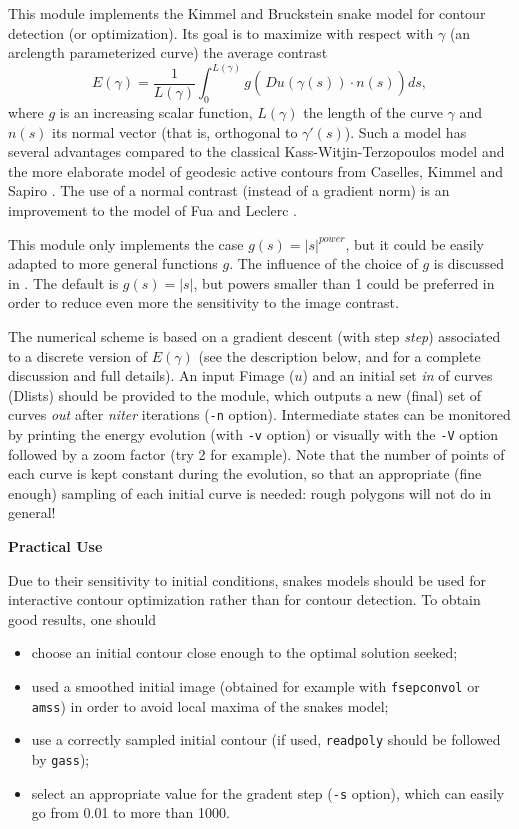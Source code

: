 This module implements the Kimmel and Bruckstein snake model
\cite{KB2} for contour detection 
(or optimization). Its goal is to maximize with respect with 
$\gamma$ (an arclength parameterized curve) the average contrast
$$E(\gamma) =\frac 1 {L(\gamma)}\int_{0}^{L(\gamma)} g\left(\frac{}{}\!\!
Du(\gamma(s))\cdot n(s)\right)ds,$$
where $g$ is an increasing scalar function, $L(\gamma)$ the length of
the curve $\gamma$ and $n(s)$ its normal vector (that is, orthogonal
to $\gamma'(s)$). Such a model has several advantages compared to
the classical Kass-Witjin-Terzopoulos model \cite{KWT} and
the more elaborate model of geodesic active contours from 
Caselles, Kimmel and Sapiro \cite{CKS}. 
The use of a normal contrast (instead
of a gradient norm) is an improvement to the model of Fua
and Leclerc \cite{FL}.

This module only implements the case
$g(s)=|s|^{power}$, but it could be easily adapted to more general 
functions $g$. The influence of the
choice of $g$ is discussed in \cite{DMM}.
The default is $g(s)=|s|$, but powers smaller than 1 could be preferred
in order to reduce even more the sensitivity to the image contrast.

The numerical scheme is based on a gradient descent (with step {\it step})
associated to a discrete version of $E(\gamma)$ (see the description 
below, and \cite{DMM} for a complete discussion and full details).
An input Fimage ($u$) and an initial set {\it in}
of curves (Dlists) should be provided
to the module, which outputs a new (final) set of curves {\it out}
after {\it niter} iterations (\verb+-n+ option). Intermediate
states can be monitored by printing the energy evolution (with
\verb+-v+ option) or visually with the \verb+-V+ option followed by
a zoom factor (try 2 for example). Note that the number of points of
each curve is kept constant during the evolution, 
so that an appropriate (fine enough) sampling 
of each initial curve is needed: rough polygons will not do in general!

\vskip 8mm

\centerline {\bf \large Practical Use}

\vskip 6mm

Due to their sensitivity to initial conditions, snakes models should
be used for interactive contour optimization rather than for contour
detection. To obtain good results, one should

\begin{itemize}
\item choose an initial contour close enough to the optimal solution seeked;
\item used a smoothed initial image (obtained for example with 
\verb+fsepconvol+ or \verb+amss+) in order to avoid local maxima
of the snakes model;
\item use a correctly sampled initial contour (if used, \verb+readpoly+ 
should be followed by \verb+gass+);
\item select an appropriate value for the gradent step (\verb+-s+ option),
which can easily go from 0.01 to more than 1000.
\end{itemize}

